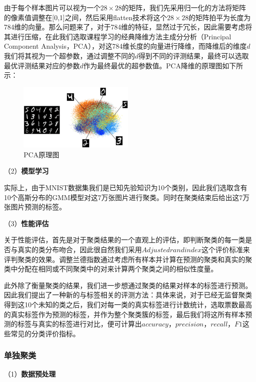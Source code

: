 \documentclass[UTF8]{ctexart}
\begin{document}
由于每个样本图片可以视为一个$28 \times 28$的矩阵，我们先采用归一化的方法将矩阵的像素值调整在[0,1]之间，然后采用flatten技术将这个$28 \times 28$的矩阵拍平为长度为784维的向量。那么问题来了，对于784维的特征，显然过于冗长，因此需要考虑将其进行压缩，在此我们选取课程学习的经典降维方法主成分分析（Principal Component Analysis，PCA），对这784维长度的向量进行降维，而降维后的维度$d$我们将其视为一个超参数，通过调整不同的$d$得到不同的评测结果，最终可以选取最优评测结果对应的参数$d$作为最终最优的超参数值。PCA降维的原理图如下所示：

\begin{figure}[!h]
  \includegraphics[width=0.5\textwidth]{./figures/PCA_mnist.png}
  \centering
  \caption{PCA原理图}
  \label{PCA-model}
\end{figure}


（2）\textbf{模型学习}

实际上，由于MNIST数据集我们是已知先验知识为10个类别，因此我们选取含有10个高斯分布的GMM模型对这7万张图片进行聚类。同时在聚类结束后给出这7万张图片预测的标签。

（3）\textbf{性能评估}

关于性能评估，首先是对于聚类结果的一个直观上的评估，即判断聚类的每一类是否与真实的类分布吻合，因此很自然我们采用$Adjusted rand index$这个评价标准来评判聚类的效果。调整兰德指数通过考虑所有样本并计算在预测的聚类和真实的聚类中分配在相同或不同聚类中的对来计算两个聚类之间的相似性度量。

此外除了衡量聚类的结果，我们进一步想通过聚类的结果对样本的标签进行预测。因此我们提出了一种新的与标签相关的评测方法：具体来说，对于已经无监督聚类得到这10个未知的类之后，我们对每一类的真实标签进行计数统计，选取票数最高的真实标签作为预测的标签，并作为整个聚类簇的标签，最后我们将这所有样本预测的标签与真实的标签进行对比，便可计算出$accuracy$，$precision$，$recall$，$F1$这些常见的分类评价指标。

\subsubsection{单独聚类}

（1）\textbf{数据预处理}
\end{document}
